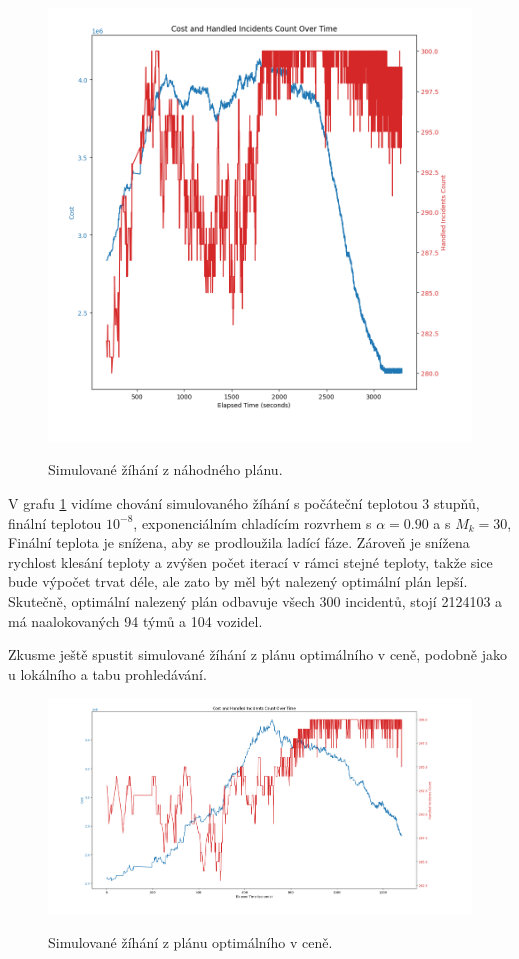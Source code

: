 \begin{figure}[H]
  \caption{Simulované žíhání z náhodného plánu.}
  \includegraphics[width=\textwidth]{img/plots/sa_random_90.png}
  \centering
  \label{img:sa_random}
\end{figure}

V grafu \ref{img:sa_random} vidíme chování simulovaného žíhání
s počáteční teplotou 3 stupňů, finální teplotou $10^{-8}$, exponenciálním chladícím rozvrhem s $\alpha = 0.90$ a s $M_k = 30$,
Finální teplota je snížena, aby se prodloužila ladící fáze.
Zároveň je snížena rychlost klesání teploty a zvýšen počet iterací v rámci stejné teploty, takže sice bude výpočet trvat déle, ale zato by měl být nalezený optimální plán lepší.
Skutečně, optimální nalezený plán odbavuje všech 300 incidentů, stojí 2124103 a má naalokovaných 94 týmů a 104 vozidel.

Zkusme ještě spustit simulované žíhání z plánu optimálního v ceně, podobně jako u lokálního a tabu prohledávání.

\begin{figure}[H]
  \caption{Simulované žíhání z plánu optimálního v ceně.}
  \includegraphics[width=\textwidth]{img/plots/sa_optimal.png}
  \centering
  \label{img:sa_optimal}
\end{figure}

